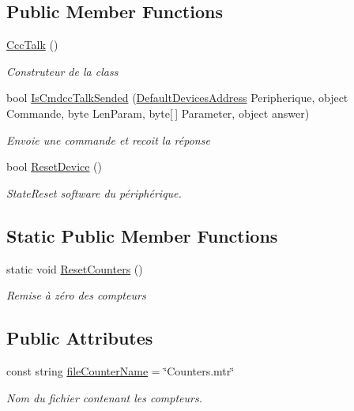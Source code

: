 \subsection*{Public Member Functions}
\begin{DoxyCompactItemize}
\item 
\mbox{\hyperlink{class_device_library_1_1_ccc_talk_acb6f8e8dcdfa88d9cdc5b3ebf1ea0e90}{Ccc\+Talk}} ()
\begin{DoxyCompactList}\small\item\em Construteur de la class \end{DoxyCompactList}\item 
bool \mbox{\hyperlink{class_device_library_1_1_ccc_talk_ab986f5ca49ce60e90442b54682f34b62}{Is\+Cmdcc\+Talk\+Sended}} (\mbox{\hyperlink{namespace_device_library_a4ca177654b0e196e5a5f5275fb4ea5ee}{Default\+Devices\+Address}} Peripherique, object Commande, byte Len\+Param, byte\mbox{[}$\,$\mbox{]} Parameter, object answer)
\begin{DoxyCompactList}\small\item\em Envoie une commande et recoit la réponse \end{DoxyCompactList}\item 
bool \mbox{\hyperlink{class_device_library_1_1_ccc_talk_a9069f40563639ecc85dac7dd9c212cee}{Reset\+Device}} ()
\begin{DoxyCompactList}\small\item\em State\+Reset software du périphérique. \end{DoxyCompactList}\end{DoxyCompactItemize}
\subsection*{Static Public Member Functions}
\begin{DoxyCompactItemize}
\item 
static void \mbox{\hyperlink{class_device_library_1_1_ccc_talk_a9e6bea86795ec29fde4e6071256eff76}{Reset\+Counters}} ()
\begin{DoxyCompactList}\small\item\em Remise à zéro des compteurs \end{DoxyCompactList}\end{DoxyCompactItemize}
\subsection*{Public Attributes}
\begin{DoxyCompactItemize}
\item 
const string \mbox{\hyperlink{class_device_library_1_1_ccc_talk_ad5c6d1287d0c049bdbf4fda8cb19c1ef}{file\+Counter\+Name}} = \char`\"{}Counters.\+mtr\char`\"{}
\begin{DoxyCompactList}\small\item\em Nom du fichier contenant les compteurs. \end{DoxyCompactList}\end{DoxyCompactItemize}
